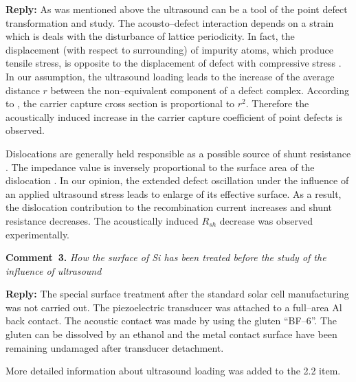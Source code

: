 \documentclass [sort&compress] {elsarticle}
\begin{document}
\noindent
\textcolor[rgb]{0.51,0.00,0.00}{\textbf{Reply:}}
As was mentioned above the ultrasound can be a tool of the point defect transformation and study.
The acousto--defect interaction depends on a strain which is deals with the disturbance of lattice periodicity. 
In fact, the displacement (with respect to surrounding) of impurity atoms, which produce tensile stress, 
is opposite to the displacement of defect with compressive stress \cite{MirzadeJAP2011,PeleshchakUJF2016}.
In our assumption, the ultrasound loading leads to the increase of the average distance $r$ between the non--equivalent
component of a defect complex.
According to \cite{CDLR:JAP,CDLR:R2}, the carrier capture cross section is proportional to $r^2$.
Therefore the acoustically induced increase in the carrier capture coefficient of point defects is observed.

Dislocations are generally held responsible as a possible source of shunt resistance \cite{Rsh:Breitenstein,TAT:Gopal,Rsh:Baker}.
The impedance value is inversely proportional to the surface area of the dislocation \cite{Rsh:Gopal2003,Rsh:Gopal2004}.
In our opinion, the extended defect oscillation under the influence of an applied ultrasound stress leads to enlarge of its effective surface.
As a result, the dislocation contribution to the recombination current increases and shunt resistance decreases.
The acoustically induced $R_{sh}$ decrease was observed experimentally.


\vspace{1cm}
\noindent
\textcolor[rgb]{0.00,0.50,1.00}{\textbf{Comment~3.}}
\emph{How the surface of Si has been treated before the study of the influence of ultrasound}

\noindent
\textcolor[rgb]{0.51,0.00,0.00}{\textbf{Reply:}}
The special surface treatment after the standard solar cell manufacturing was not carried out.
The piezoelectric transducer was attached to a full--area Al back contact.
The acoustic contact was made by using the gluten ``BF--6''.
The gluten can be dissolved by an ethanol and 
the metal contact surface have been remaining undamaged after transducer detachment.

More detailed information about ultrasound loading was added to the 2.2 item.







\end{document}

